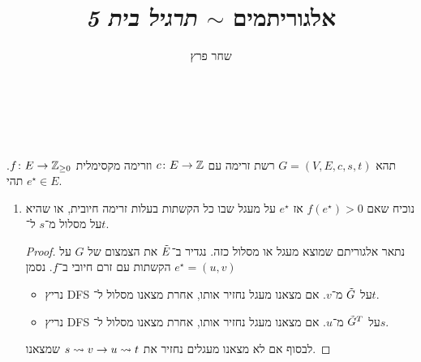\documentclass[]{article}
\author{שחר פרץ}
\title{אלגוריתמים $\sim$ \textit{תרגיל בית 5}}
\newcommand\str {^{\star}}
\begin{document}
	
	\ {} \\ \ \\ \ \\ 

	תהא $G = (V, E, c, s, t)$ רשת זרימה עם $c \colon E \to \mathbb{Z}$ וזרימה מקסימלית $f \colon E \to \mathbb{Z}_{\ge 0}$. תהי $e^\star \in E$. 
	\begin{enumerate}
		\item נוכיח שאם $f(e\str) > 0$ אז $e\str$ על מעגל שבו כל הקשתות בעלות זרימה חיובית, או שהיא על מסלול מ־$s$ ל־$t$. 
		\begin{proof}
			נתאר אלגוריתם שמוצא מעגל או מסלול כזה. נגדיר ב־$\tilde E$ את הצמצום של $G$ על הקשתות עם זרם חיובי ב־$f$. נסמן $e\str = (u, v)$
			\begin{itemize}
				\item נריץ DFS על $\tilde G$ מ־$v$. אם מצאנו מעגל נחזיר אותו, אחרת מצאנו מסלול ל־$t$. 
				\item נריץ DFS על $\tilde G^T$ מ־$u$. אם מצאנו מעגל נחזיר אותו, אחרת מצאנו מסלול ל־$s$. 
			\end{itemize}
			לבסוף אם לא מצאנו מעגלים נחזיר את $s \rightsquigarrow v \to u \rightsquigarrow t$ שמצאנו. 
			

\end{proof}
\end{enumerate}
\end{document}
